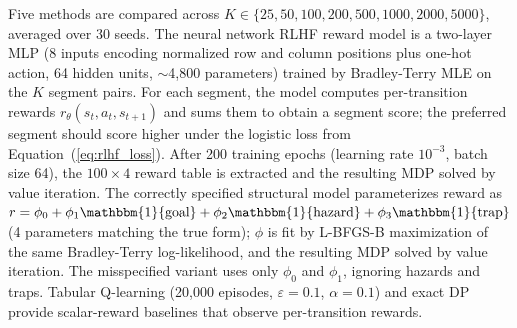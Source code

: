 Five methods are compared across $K \in \{25, 50, 100, 200, 500, 1000, 2000, 5000\}$, averaged over 30 seeds. The neural network RLHF reward model is a two-layer MLP (8 inputs encoding normalized row and column positions plus one-hot action, 64 hidden units, $\sim$4,800 parameters) trained by Bradley-Terry MLE on the $K$ segment pairs. For each segment, the model computes per-transition rewards $r_\theta(s_t, a_t, s_{t+1})$ and sums them to obtain a segment score; the preferred segment should score higher under the logistic loss from Equation~(\ref{eq:rlhf_loss}). After 200 training epochs (learning rate $10^{-3}$, batch size 64), the $100 \times 4$ reward table is extracted and the resulting MDP solved by value iteration. The correctly specified structural model parameterizes reward as $r = \phi_0 + \phi_1 \mathbbm{1}\{\text{goal}\} + \phi_2 \mathbbm{1}\{\text{hazard}\} + \phi_3 \mathbbm{1}\{\text{trap}\}$ (4 parameters matching the true form); $\phi$ is fit by L-BFGS-B maximization of the same Bradley-Terry log-likelihood, and the resulting MDP solved by value iteration. The misspecified variant uses only $\phi_0$ and $\phi_1$, ignoring hazards and traps. Tabular Q-learning (20,000 episodes, $\varepsilon = 0.1$, $\alpha = 0.1$) and exact DP provide scalar-reward baselines that observe per-transition rewards.

\begin{table}[htbp]
\centering
\caption{Sample complexity of preference-based policy learning on a stochastic $10 \times 10$ gridworld (30 seeds). The neural network reward model reaches 99\% of DP-optimal at $K = 1{,}000$. The correctly specified structural model reaches 100\% at $K = 5{,}000$ but has high variance at intermediate $K$. The misspecified model plateaus near 98\% while routing through hazard cells.}
\label{tab:rlhf_gridworld}

\end{table}

